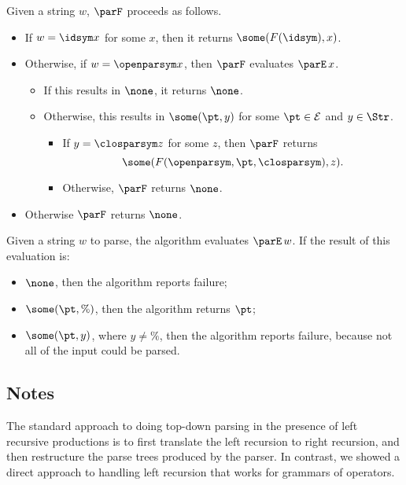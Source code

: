 Given a string $w$, $\parF$ proceeds as follows.
\begin{itemize}
\item If $w=\idsym x$ for some $x$, then it returns
  $\some(F(\idsym),x)$.

\item Otherwise, if $w=\openparsym x$, then $\parF$ evaluates
  $\parE\,x$.
  \begin{itemize}
  \item If this results in $\none$, it returns $\none$.
      
  \item Otherwise, this results in $\some(\pt,y)$ for some
    $\pt\in{\cal E}$ and $y\in\Str$.
    \begin{itemize}
    \item If $y=\closparsym z$ for some $z$, then $\parF$ returns
      \begin{displaymath}
       \some(F(\openparsym,\pt,\closparsym), z) . 
      \end{displaymath}
    
    \item Otherwise, $\parF$ returns $\none$.
    \end{itemize}
  \end{itemize}

  \item Otherwise $\parF$ returns $\none$.
\end{itemize}

Given a string $w$ to parse, the algorithm evaluates
$\parE\,w$.  If the result of this evaluation is:
\begin{itemize}
\item $\none$, then the algorithm reports failure;

\item $\some(\pt,\%)$, then the algorithm returns $\pt$;

\item $\some(\pt,y)$, where $y\neq\%$, then the algorithm reports failure,
  because not all of the input could be parsed.
\end{itemize}

\subsection{Notes}

The standard approach to doing top-down parsing in the presence of
left recursive productions is to first translate the left recursion to
right recursion, and then restructure the parse trees produced by the
parser.  In contrast, we showed a direct approach to handling left
recursion that works for grammars of operators.

